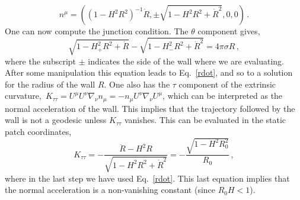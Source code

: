 \documentclass[a4paper,11pt]{article}
\numberwithin{equation}{section}
\begin{document}
\begin{equation}
n^\mu = \left((1-H^2 R^2)^{-1} \dot{R}, \pm \sqrt{1-H^2 R^2 + \dot{R}^2},0,0\right) \,.
\end{equation}
One can now compute the junction condition. The $\theta$ component gives,
\begin{equation}
\sqrt{1-H_+^2 R^2+\dot R}-\sqrt{1-H_-^2 R^2+\dot R^2}=4\pi\sigma R \,,
\end{equation}
where the subscript $\pm$ indicates the side of the wall where we are evaluating.
After some manipulation this equation leads to Eq.~\eqref{rdot}, and so to a solution for the radius of the wall $R$. One also has the  $\tau$ component of the extrinsic curvature,\
$K_{\tau\tau}=U^{\mu}U^{\nu}\nabla_{\nu}n_{\mu}=-n_\mu U^{\nu}\nabla_\nu U^\mu $, which can be interpreted as the normal acceleration of the wall.  This implies that the trajectory followed by the  wall is not a geodesic unless $K_{\tau\tau}$ vanishes. This can be  evaluated in the static patch coordinates,
\begin{equation}
K_{\tau\tau}=-\frac{\ddot R-H^2 R}{\sqrt{1-H^2 R^2+\dot R^2}}=-\frac{\sqrt{1-H ^2R_0^2}}{R_0} \,, \label{eq:normalcurvature}
\end{equation}
where in the last step we have used Eq.~\eqref{rdot}. This last equation implies that the normal acceleration is a non-vanishing constant (since $R_0H<1$).
\end{document}
